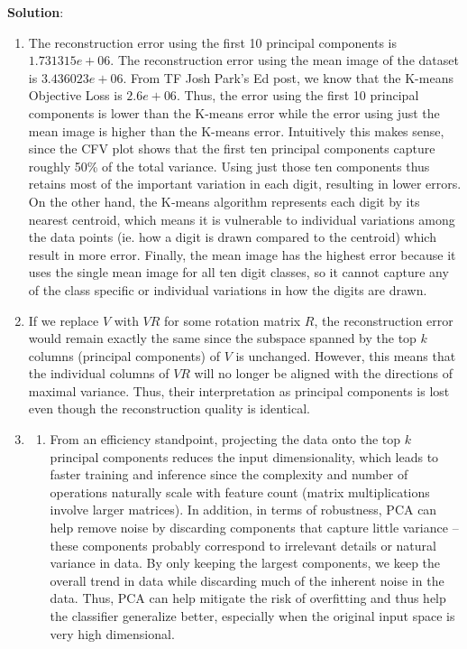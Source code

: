 \documentclass[submit]{../harvardml}
\newenvironment{solution}{
    \vspace{2mm}
    \color{blue}\noindent\textbf{Solution}:
}{}
\begin{document}
\begin{solution}
\begin{enumerate}
    \item The reconstruction error using the first 10 principal components is $1.731315e+06$. The reconstruction error using the mean image of the dataset is $3.436023e+06$. From TF Josh Park's Ed post, we know that the K-means Objective Loss is $2.6e+06$. Thus, the error using the first 10 principal components is lower than the K-means error while the error using just the mean image is higher than the K-means error. Intuitively this makes sense, since the CFV plot shows that the first ten principal components capture roughly 50\% of the total variance. Using just those ten components thus retains most of the important variation in each digit, resulting in lower errors. On the other hand, the K‑means algorithm represents each digit by its nearest centroid, which means it is vulnerable to individual variations among the data points (ie. how a digit is drawn compared to the centroid) which result in more error. Finally, the mean image has the highest error because it uses the single mean image for all ten digit classes, so it cannot capture any of the class specific or individual variations in how the digits are drawn.
    
    \item  If we replace $V$ with $VR$ for some rotation matrix $R$, the reconstruction error would remain exactly the same since the subspace spanned by the top $k$ columns (principal components) of $V$ is unchanged. However, this means that the individual columns of $VR$ will no longer be aligned with the directions of maximal variance. Thus, their interpretation as principal components is lost even though the reconstruction quality is identical.

    \item 
    \begin{enumerate}
        \item From an efficiency standpoint, projecting the data onto the top $k$ principal components reduces the input dimensionality, which leads to faster training and inference since the complexity and number of operations naturally scale with feature count (matrix multiplications involve larger matrices). In addition, in terms of robustness, PCA can help remove noise by discarding components that capture little variance -- these components probably correspond to irrelevant details or natural variance in data. By only keeping the largest components, we keep the overall trend in data while discarding much of the inherent noise in the data. Thus, PCA can help mitigate the risk of overfitting and thus help the classifier generalize better, especially when the original input space is very high dimensional.
    

\end{enumerate}
\end{enumerate}
\end{solution}
\end{document}
